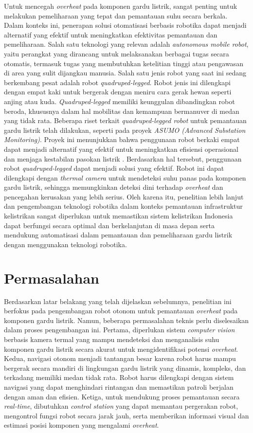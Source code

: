 Untuk mencegah \emph{overheat} pada komponen gardu listrik, sangat penting untuk melakukan pemeliharaan yang tepat dan pemantauan suhu secara berkala. Dalam konteks ini, penerapan solusi otomatisasi berbasis robotika dapat menjadi alternatif yang efektif untuk meningkatkan efektivitas pemantauan dan pemeliharaan. Salah satu teknologi yang relevan adalah \emph{autonomous mobile robot}, yaitu perangkat yang dirancang untuk melaksanakan berbagai tugas secara otomatis, termasuk tugas yang membutuhkan ketelitian tinggi atau pengawasan di area yang sulit dijangkau manusia. Salah satu jenis robot yang saat ini sedang berkembang pesat adalah robot \emph{quadruped-legged}. Robot jenis ini dilengkapi dengan empat kaki untuk bergerak dengan meniru cara gerak hewan seperti anjing atau kuda. \emph{Quadruped-legged} memiliki keunggulan dibandingkan robot beroda, khususnya dalam hal mobilitas dan kemampuan bermanuver di medan yang tidak rata. Beberapa riset terkait \emph{quadruped-legged robot} untuk pemantauan gardu listrik telah dilakukan, seperti pada proyek \emph{ASUMO (Advanced Substation Monitoring)}. Proyek ini menunjukkan bahwa penggunaan robot berkaki empat dapat menjadi alternatif yang efektif untuk meningkatkan efisiensi operasional dan menjaga kestabilan pasokan listrik \cite{ASUMO2023}.  Berdasarkan hal tersebut, penggunaan robot \emph{quadruped-legged} dapat menjadi solusi yang efektif. Robot ini dapat dilengkapi dengan \emph{thermal camera} untuk mendeteksi suhu panas pada komponen gardu listrik, sehingga memungkinkan deteksi dini terhadap \emph{overheat} dan pencegahan kerusakan yang lebih serius. Oleh karena itu, penelitian lebih lanjut dan pengembangan teknologi robotika dalam konteks pemantauan infrastruktur kelistrikan sangat diperlukan untuk memastikan sistem kelistrikan Indonesia dapat berfungsi secara optimal dan berkelanjutan di masa depan serta mendukung automatisasi dalam pemantauan dan pemeliharaan gardu listrik dengan menggunakan teknologi robotika.

\section{Permasalahan}
Berdasarkan latar belakang yang telah dijelaskan sebelumnya, penelitian ini berfokus pada pengembangan robot otonom untuk pemantauan \emph{overheat} pada komponen gardu listrik. Namun, beberapa permasalahan teknis perlu diselesaikan dalam proses pengembangan ini. Pertama, diperlukan sistem \emph{computer vision} berbasis kamera termal yang mampu mendeteksi dan menganalisis suhu komponen gardu listrik secara akurat untuk mengidentifikasi potensi \emph{overheat}. Kedua, navigasi otonom menjadi tantangan besar karena robot harus mampu bergerak secara mandiri di lingkungan gardu listrik yang dinamis, kompleks, dan terkadang memiliki medan tidak rata. Robot harus dilengkapi dengan sistem navigasi yang dapat menghindari rintangan dan memastikan patroli berjalan dengan aman dan efisien. Ketiga, untuk mendukung proses pemantauan secara \emph{real-time}, dibutuhkan \emph{control station} yang dapat memantau pergerakan robot, mengontrol fungsi robot secara jarak jauh, serta memberikan informasi visual dan estimasi posisi komponen yang mengalami \emph{overheat}.

